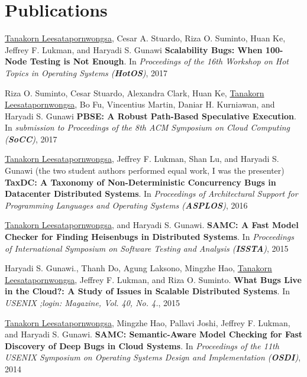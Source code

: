 \documentclass[10pt]{article} %
\begin{document}

\section{Publications}

\underline{Tanakorn Leesatapornwongsa}, Cesar A. Stuardo, Riza O. Suminto, Huan Ke, 
Jeffrey F. Lukman, and Haryadi S. Gunawi \textbf{Scalability Bugs: When 100-Node
Testing is Not Enough}. In \textit{Proceedings of the 16th Workshop on Hot Topics
in Operating Systems (\textbf{HotOS})}, 2017 
\vspace{2mm}

Riza O. Suminto, Cesar Stuardo, Alexandra Clark, Huan Ke, \underline{Tanakorn
Leesatapornwongsa}, Bo Fu, Vincentius Martin, Daniar H. Kurniawan, and Haryadi
S. Gunawi \textbf{PBSE: A Robust Path-Based Speculative Execution}. In
\textit{submission to Proceedings of the 8th ACM Symposium on Cloud Computing
(\textbf{SoCC})}, 2017
\vspace{2mm}

\underline{Tanakorn Leesatapornwongsa}, Jeffrey F. Lukman, Shan Lu, and Haryadi
S. Gunawi (the two student authors performed equal work, I was the presenter)
\textbf{TaxDC: A Taxonomy of Non-Deterministic Concurrency Bugs in Datacenter
Distributed Systems}. In \textit{Proceedings of Architectural Support for
Programming Languages and Operating Systems (\textbf{ASPLOS})}, 2016 
\vspace{2mm}

\underline{Tanakorn Leesatapornwongsa}, and Haryadi S. Gunawi. \textbf{SAMC: A
Fast Model Checker for Finding Heisenbugs in Distributed Systems}. In
\textit{Proceedings of International Symposium on Software Testing and Analysis
(\textbf{ISSTA})}, 2015
\vspace{2mm}

Haryadi S. Gunawi., Thanh Do, Agung Laksono, Mingzhe Hao, \underline{Tanakorn
Leesatapornwongsa}, Jeffrey F. Lukman, and Riza O. Suminto.  \textbf{What Bugs
Live in the Cloud?: A Study of Issues in Scalable Distributed Systems}. In
\textit{USENIX ;login: Magazine, Vol. 40, No. 4.}, 2015 
\vspace{2mm}

\underline{Tanakorn Leesatapornwongsa}, Mingzhe Hao, Pallavi Joshi, Jeffrey F.
Lukman, and Haryadi S. Gunawi. \textbf{SAMC: Semantic-Aware Model Checking for
Fast Discovery of Deep Bugs in Cloud Systems}. In \textit{Proceedings of the
11th USENIX Symposium on Operating Systems Design and Implementation (\textbf{OSDI})},
2014
\vspace{2mm}
\end{document}
